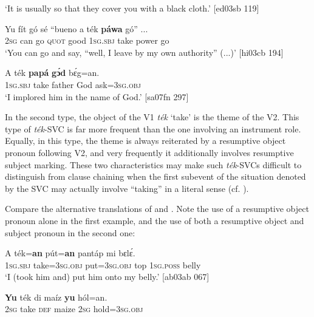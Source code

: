 \glt ‘It is usually so that they cover you with a black cloth.’ [ed03sb 119]
\z


\ea%
    \label{ex:key:1562}
    \gll Yu  fít  gó  sé    “bueno  a    ték    \textbf{páwa}  gó”  \op...\cp{}\\
\textsc{2sg}  can  go  \textsc{quot}    good  \textsc{1sg.sbj}  take    power  go\\

\glt ‘You can go and say, “well, I leave by my own authority” (...)’ [hi03cb 194]
\z


\ea%
    \label{ex:key:1563}
    \gll A    ték    \textbf{papá}  \textbf{gɔ́d}  bɛ́g=an.\\
\textsc{1sg.sbj}  take    father  God  ask=\textsc{3sg.obj}\\

\glt ‘I implored him in the name of God.’ [sa07fn 297]
\z

In the second type, the object of the V1 \textit{ték} ‘take’ is the theme of the V2. This type of \textit{ték}{}-SVC is far more frequent than the one involving an instrument role. Equally, in this type, the theme is always reiterated by a resumptive object pronoun following V2, and very frequently it additionally involves resumptive subject marking. These two characteristics may make such \textit{ték}{}-SVCs difficult to distinguish from clause chaining when the first subevent of the situation denoted by the SVC may actually involve “taking” in a literal sense (cf. ).


Compare the alternative translations of  and . Note the use of a resumptive object pronoun alone in the first example, and the use of both a resumptive object and subject pronoun in the second one:



\ea%
    \label{ex:key:1564}
    \gll A    ték=\textbf{an}    pút=\textbf{an}    pantáp  mi    bɛlɛ́.\\
\textsc{1sg.sbj}  take=\textsc{3sg.obj}  put=\textsc{3sg.obj}  top    \textsc{1sg.poss}  belly\\

\glt ‘I (took him and) put him onto my belly.’ [ab03ab 067]
\z


\ea%
    \label{ex:key:1565}
    \gll \textbf{Yu}  ték   di  maíz  \textbf{yu}  hól=an.\\
\textsc{2sg}  take    \textsc{def}  maize  \textsc{2sg}  hold=\textsc{3sg.obj}\\

